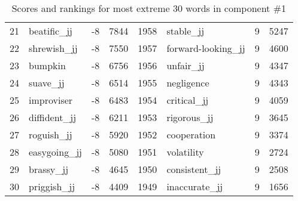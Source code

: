 \begin{table}[tbp]
\begin{tabular}{| rlr@{.}l | rlr@{.}l |}
    21 & beatific\_jj & -8 & 7844    &    1958 & stable\_jj & 9 & 5247 \\
    22 & shrewish\_jj & -8 & 7550    &    1957 & forward-looking\_jj & 9 & 4600 \\
    23 & bumpkin & -8 & 6756    &    1956 & unfair\_jj & 9 & 4347 \\
    24 & suave\_jj & -8 & 6514    &    1955 & negligence & 9 & 4343 \\
    25 & improviser & -8 & 6483    &    1954 & critical\_jj & 9 & 4059 \\
    26 & diffident\_jj & -8 & 6211    &    1953 & rigorous\_jj & 9 & 3645 \\
    27 & roguish\_jj & -8 & 5920    &    1952 & cooperation & 9 & 3374 \\
    28 & easygoing\_jj & -8 & 5080    &    1951 & volatility & 9 & 2724 \\
    29 & brassy\_jj & -8 & 4645    &    1950 & consistent\_jj & 9 & 2508 \\
    30 & priggish\_jj & -8 & 4409    &    1949 & inaccurate\_jj & 9 & 1656 \\
    \hline
    \end{tabular}
    \caption{Scores and rankings for most extreme 30 words in component \#1} 
\end{table}
\clearpage
